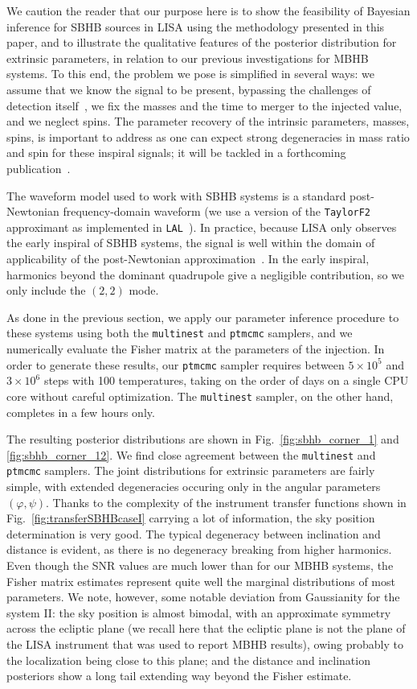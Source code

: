 \documentclass[aps,showpacs,twocolumn,prd,superscriptaddress,nofootinbib]{revtex4-1}
\begin{document}
We caution the reader that our purpose here is to show the feasibility of
Bayesian inference for SBHB sources in LISA using the methodology presented in
this paper, and to illustrate the qualitative features of the posterior distribution for extrinsic parameters, in relation to our previous investigations for MBHB systems. To this end, the problem we pose is simplified
in several ways: we assume that we know the signal to be present, bypassing the challenges of detection itself~\cite{Moore+19}, we fix the masses and the time to merger to the injected value, and we neglect spins. The parameter recovery of the intrinsic parameters, masses, spins, is important to address as one can expect strong degeneracies in mass ratio and spin for these inspiral signals; it will be tackled in a forthcoming publication~\cite{Toubiana+20}.

The waveform model used to work with SBHB systems is a standard post-Newtonian
frequency-domain waveform (we use a version of the \texttt{TaylorF2} approximant as implemented in \texttt{LAL}~\cite{lal}). In practice, because LISA only observes the early
inspiral of SBHB systems, the signal is well within the domain of applicability of the post-Newtonian approximation~\cite{Mangiagli+18}.
In the early inspiral, harmonics beyond the dominant quadrupole give a negligible contribution, so we only include the $(2,2)$ mode.

As done in the previous section, we apply our parameter inference procedure to
these systems using both the \texttt{multinest} and \texttt{ptmcmc} samplers, and we
numerically evaluate the Fisher matrix at the parameters of the injection. In order to generate these results, our \texttt{ptmcmc} sampler requires between
$5\times 10^5$ and $3\times 10^6$ steps with 100 temperatures, taking on the
order of days on a single CPU core without careful optimization. The \texttt{multinest}
sampler, on the other hand, completes in a few hours only.

The resulting posterior distributions are shown in Fig.~\ref{fig:sbhb_corner_1}
and \ref{fig:sbhb_corner_12}. We find close agreement between the \texttt{multinest} and
\texttt{ptmcmc} samplers. The joint distributions for extrinsic parameters are fairly simple, with extended degeneracies occuring only in the angular parameters $(\varphi, \psi)$. Thanks to the complexity of the instrument transfer functions shown in Fig.~\ref{fig:transferSBHBcaseI} carrying a lot of information, the sky position determination is very good. The typical degeneracy between inclination and distance
is evident, as there is no degeneracy breaking from higher harmonics. Even though the SNR values are much lower than for our MBHB systems, the Fisher matrix estimates represent quite well the marginal
distributions of most parameters. We note, however, some notable deviation from Gaussianity for the system II: the sky position is almost bimodal, with an approximate symmetry across the ecliptic plane (we recall here that the ecliptic plane is not the plane of the LISA instrument that was used to report MBHB results), owing probably to the localization being close to this plane; and the distance and inclination posteriors show a long tail extending way beyond the Fisher estimate.
\end{document}
